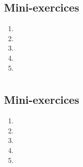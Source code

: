 \subsection{Mini-exercices}

\begin{enumerate}
  \item 
  \item 
  \item 
  \item 
  \item 
\end{enumerate}


\section{}

\subsection{}

\subsection{}

\subsection{}

\subsection{}

\subsection{Mini-exercices}

\begin{enumerate}
  \item 
  \item 
  \item 
  \item 
  \item 
\end{enumerate}







